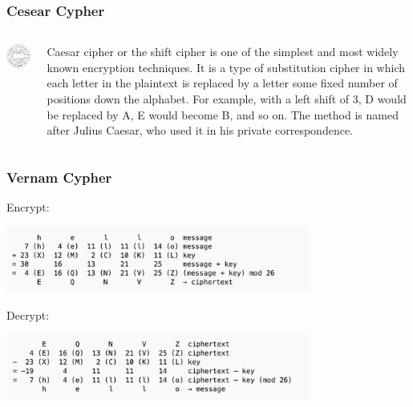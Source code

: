 \documentclass{beamer}
\begin{document}
\begin{frame}\frametitle{Cesear Cypher}
\begin{columns}
\begin{column}{4.5cm}
\begin{center}
\includegraphics[width=4.5cm]{fig/crypt4.png}
\end{center}
\end{column}
\begin{column}{7cm}
Caesar cipher or the shift cipher is one of the simplest and most widely known encryption techniques. It is a type of substitution cipher in which each letter in the plaintext is replaced by a letter some fixed number of positions down the alphabet. For example, with a left shift of 3, D would be replaced by A, E would become B, and so on. The method is named after Julius Caesar, who used it in his private correspondence.
\end{column}
\end{columns}
\end{frame}

\begin{frame}\frametitle{Vernam Cypher}

Encrypt:
\begin{center}
\includegraphics[width=10cm]{fig/crypt5a.jpg}
\end{center}

Decrypt:
\begin{center}
\includegraphics[width=10cm]{fig/crypt5b.jpg}
\end{center}


\end{frame}
\end{document}
